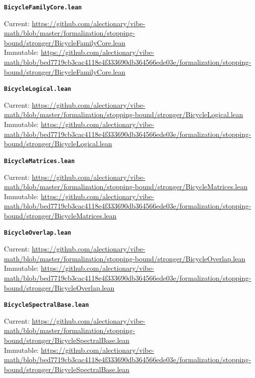 \smallskip
\medskip
\par\noindent\textbf{\texttt{BicycleFamilyCore.lean}}\par\nopagebreak
{\footnotesize\noindent Current: \url{https://github.com/alectionary/vibe-math/blob/master/formalization/stopping-bound/stronger/BicycleFamilyCore.lean}\\
Immutable: \url{https://github.com/alectionary/vibe-math/blob/bed7719cb3cac4118e4f333690db364566ede03e/formalization/stopping-bound/stronger/BicycleFamilyCore.lean}\par}
\smallskip
\medskip
\par\noindent\textbf{\texttt{BicycleLogical.lean}}\par\nopagebreak
{\footnotesize\noindent Current: \url{https://github.com/alectionary/vibe-math/blob/master/formalization/stopping-bound/stronger/BicycleLogical.lean}\\
Immutable: \url{https://github.com/alectionary/vibe-math/blob/bed7719cb3cac4118e4f333690db364566ede03e/formalization/stopping-bound/stronger/BicycleLogical.lean}\par}
\smallskip
\medskip
\par\noindent\textbf{\texttt{BicycleMatrices.lean}}\par\nopagebreak
{\footnotesize\noindent Current: \url{https://github.com/alectionary/vibe-math/blob/master/formalization/stopping-bound/stronger/BicycleMatrices.lean}\\
Immutable: \url{https://github.com/alectionary/vibe-math/blob/bed7719cb3cac4118e4f333690db364566ede03e/formalization/stopping-bound/stronger/BicycleMatrices.lean}\par}
\smallskip
\medskip
\par\noindent\textbf{\texttt{BicycleOverlap.lean}}\par\nopagebreak
{\footnotesize\noindent Current: \url{https://github.com/alectionary/vibe-math/blob/master/formalization/stopping-bound/stronger/BicycleOverlap.lean}\\
Immutable: \url{https://github.com/alectionary/vibe-math/blob/bed7719cb3cac4118e4f333690db364566ede03e/formalization/stopping-bound/stronger/BicycleOverlap.lean}\par}
\smallskip
\medskip
\par\noindent\textbf{\texttt{BicycleSpectralBase.lean}}\par\nopagebreak
{\footnotesize\noindent Current: \url{https://github.com/alectionary/vibe-math/blob/master/formalization/stopping-bound/stronger/BicycleSpectralBase.lean}\\
Immutable: \url{https://github.com/alectionary/vibe-math/blob/bed7719cb3cac4118e4f333690db364566ede03e/formalization/stopping-bound/stronger/BicycleSpectralBase.lean}\par}
